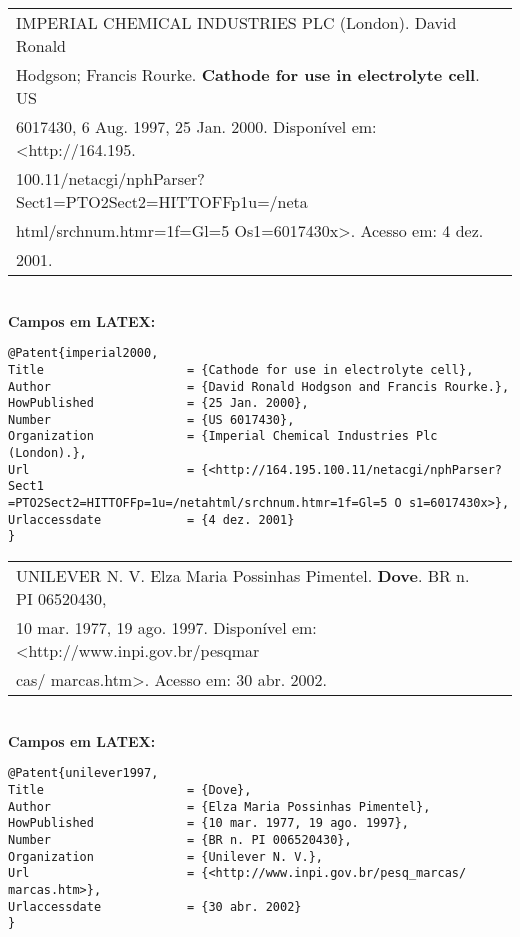 \begin{tabular}{|l|c|} \hline
	IMPERIAL CHEMICAL INDUSTRIES PLC (London). David Ronald \\Hodgson; Francis Rourke. \textbf{Cathode for use in electrolyte cell}. US \\6017430, 6 Aug. 1997, 25 Jan. 2000. Disponível em:
	<http://164.195.                                        \\100.11/netacgi/nphParser?Sect1=PTO2Sect2=HITTOFFp1u=/neta\\html/srchnum.htmr=1f=Gl=5 Os1=6017430x>. Acesso em: 4 dez. \\2001. 
	                                                        \\\hline
\end{tabular} \\
	
\textbf{Campos em LATEX:} 
	
\begingroup
\fontsize{10pt}{12pt}\selectfont
\begin{verbatim}
@Patent{imperial2000,
Title                    = {Cathode for use in electrolyte cell},
Author                   = {David Ronald Hodgson and Francis Rourke.},
HowPublished             = {25 Jan. 2000},
Number                   = {US 6017430},
Organization             = {Imperial Chemical Industries Plc (London).},
Url                      = {<http://164.195.100.11/netacgi/nphParser?Sect1
=PTO2Sect2=HITTOFFp=1u=/netahtml/srchnum.htmr=1f=Gl=5 O s1=6017430x>},
Urlaccessdate            = {4 dez. 2001}
}

\end{verbatim}
\endgroup
	
	
\begin{tabular}{|l|c|} \hline
	UNILEVER N. V. Elza Maria Possinhas Pimentel. \textbf{Dove}. BR n. PI 06520430, \\ 10 mar. 1977, 19 ago. 1997. Disponível em: <http://www.inpi.gov.br/pesqmar\\cas/ marcas.htm>. Acesso em: 30 abr.
	2002.                                                                           
	                                                                                \\\hline
\end{tabular} \\
	
\textbf{Campos em LATEX:} 
	
\begingroup
\fontsize{10pt}{12pt}\selectfont
\begin{verbatim}
@Patent{unilever1997,
Title                    = {Dove},
Author                   = {Elza Maria Possinhas Pimentel},
HowPublished             = {10 mar. 1977, 19 ago. 1997},
Number                   = {BR n. PI 006520430},
Organization             = {Unilever N. V.},
Url                      = {<http://www.inpi.gov.br/pesq_marcas/
marcas.htm>},
Urlaccessdate            = {30 abr. 2002}
}
\end{verbatim}
\endgroup
	
